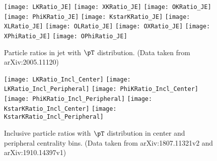 \begin{figure}[ht]
        \begin{center}
                \texttt{[image: LKRatio\_JE]}
                \texttt{[image: XKRatio\_JE]}
                \texttt{[image: OKRatio\_JE]}
                \texttt{[image: PhiKRatio\_JE]}
                \texttt{[image: KstarKRatio\_JE]}
                \texttt{[image: XLRatio\_JE]}
                \texttt{[image: OLRatio\_JE]}
                \texttt{[image: OXRatio\_JE]}
                \texttt{[image: XPhiRatio\_JE]}
                \texttt{[image: OPhiRatio\_JE]}
        \end{center}
	\caption{Particle ratios in jet with $\pT$ distribution. (Data taken from arXiv:2005.11120)}
        \label{fig:JEParRatio}
\end{figure}

\begin{figure}[ht]
	\begin{center}
		\texttt{[image: LKRatio\_Incl\_Center]}
		\texttt{[image: LKRatio\_Incl\_Peripheral]}
		\texttt{[image: PhiKRatio\_Incl\_Center]}
		\texttt{[image: PhiKRatio\_Incl\_Peripheral]}
		\texttt{[image: KstarKRatio\_Incl\_Center]}
		\texttt{[image: KstarKRatio\_Incl\_Peripheral]}
	\end{center}
  \caption{Inclusive particle ratios  with $\pT$ distribution in center and peripheral centrality bins. (Data taken from arXiv:1807.11321v2 and arXiv:1910.14397v1)}
  \label{fig:InclParRatioCentPeri}
\end{figure}


